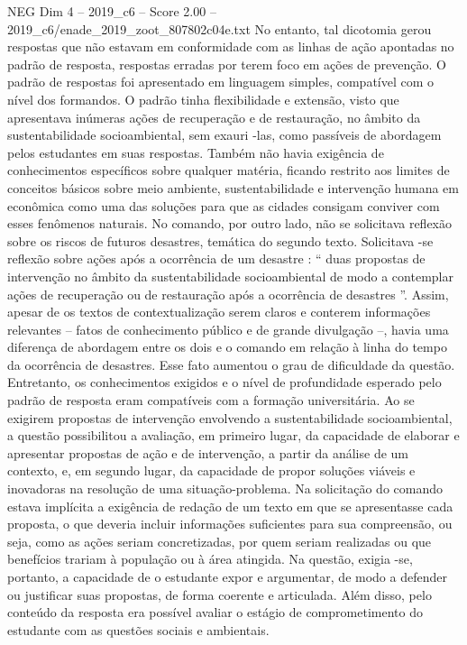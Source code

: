 \begin{textsample}{NEG Dim 4 – 2019\_c6 – Score 2.00 – 2019\_c6/enade\_2019\_zoot\_807802c04e.txt}
No entanto, tal dicotomia gerou respostas que não estavam em conformidade com as linhas de ação apontadas no padrão de resposta, respostas erradas por terem foco em ações de prevenção.
O padrão de respostas foi apresentado em linguagem simples, compatível com o nível dos formandos.
O padrão tinha flexibilidade e extensão, visto que apresentava inúmeras ações de recuperação e de restauração, no âmbito da sustentabilidade socioambiental, sem exauri -las, como passíveis de abordagem pelos estudantes em suas respostas.
Também não havia exigência de conhecimentos específicos sobre qualquer matéria, ficando restrito aos limites de conceitos básicos sobre meio ambiente, sustentabilidade e intervenção humana em econômica como uma das soluções para que as cidades consigam conviver com esses fenômenos naturais.
No comando, por outro lado, não se solicitava reflexão sobre os riscos de futuros desastres, temática do segundo texto.
Solicitava -se reflexão sobre ações após a ocorrência de um desastre : “ duas propostas de intervenção no âmbito da sustentabilidade socioambiental de modo a contemplar ações de recuperação ou de restauração após a ocorrência de desastres ”.
Assim, apesar de os textos de contextualização serem claros e conterem informações relevantes – fatos de conhecimento público e de grande divulgação –, havia uma diferença de abordagem entre os dois e o comando em relação à linha do tempo da ocorrência de desastres.
Esse fato aumentou o grau de dificuldade da questão.
Entretanto, os conhecimentos exigidos e o nível de profundidade esperado pelo padrão de resposta eram compatíveis com a formação universitária.
Ao se exigirem propostas de intervenção envolvendo a sustentabilidade socioambiental, a questão possibilitou a avaliação, em primeiro lugar, da capacidade de elaborar e apresentar propostas de ação e de intervenção, a partir da análise de um contexto, e, em segundo lugar, da capacidade de propor soluções viáveis e inovadoras na resolução de uma situação-problema.
Na solicitação do comando estava implícita a exigência de redação de um texto em que se apresentasse cada proposta, o que deveria incluir informações suficientes para sua compreensão, ou seja, como as ações seriam concretizadas, por quem seriam realizadas ou que benefícios trariam à população ou à área atingida.
Na questão, exigia -se, portanto, a capacidade de o estudante expor e argumentar, de modo a defender ou justificar suas propostas, de forma coerente e articulada.
Além disso, pelo conteúdo da resposta era possível avaliar o estágio de comprometimento do estudante com as questões sociais e ambientais.

\end{textsample}
